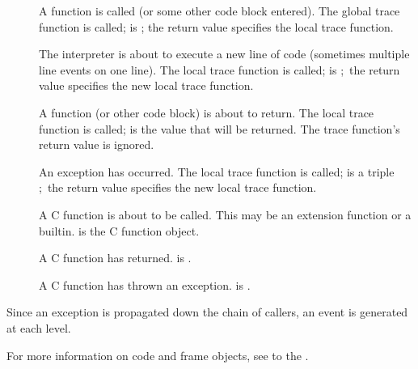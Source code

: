 \begin{description}

\item[]
A function is called (or some other code block entered).  The global
trace function is called;  is ;
the return value specifies the local trace function.

\item[]
The interpreter is about to execute a new line of code (sometimes
multiple line events on one line).  The local trace function is
called;  is ;\ the return value specifies the new
local trace function.

\item[]
A function (or other code block) is about to return.  The local trace
function is called;  is the value that will be returned.  The
trace function's return value is ignored.

\item[]
An exception has occurred.  The local trace function is called;
 is a triple ;\ the return value specifies the new local trace
function.

\item[]
A C function is about to be called.  This may be an extension function
or a builtin.   is the C function object.

\item[]
A C function has returned.  is .

\item[]
A C function has thrown an exception.   is .

\end{description}

Since an exception is propagated down the chain of callers, an
 event is generated at each level.

For more information on code and frame objects, see to the
.
